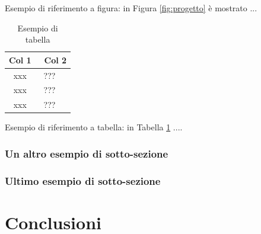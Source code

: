 \documentclass[envcountsame,envcountchap]{svmono}
\begin{document}
Esempio di riferimento a figura: in Figura \ref{fig:progetto} è mostrato ... 



\begin{table}[t]
    \begin{center}
    \begin{tabular}{||c|l||}
      \hline
      \hline
     Col 1  & \ Col 2 \\ \hline
      xxx  & \ ??? \\ \hline
      xxx  & \ ??? \\ \hline
      xxx & \ ??? \\ \hline
    \hline
    \hline
    \end{tabular}
    \end{center}
    \caption{Esempio di tabella}\label{table:notation}
\end{table}


Esempio di riferimento a tabella: in Tabella \ref{table:notation} ....


\subsection{Un altro esempio di sotto-sezione}
\Blindtext[5]

\subsection{Ultimo esempio di sotto-sezione}
\Blindtext[5]




\chapter{Conclusioni\cite{vidas2011all}}
\label{cap:conclusioni}


\Blindtext[6]





\end{document}
